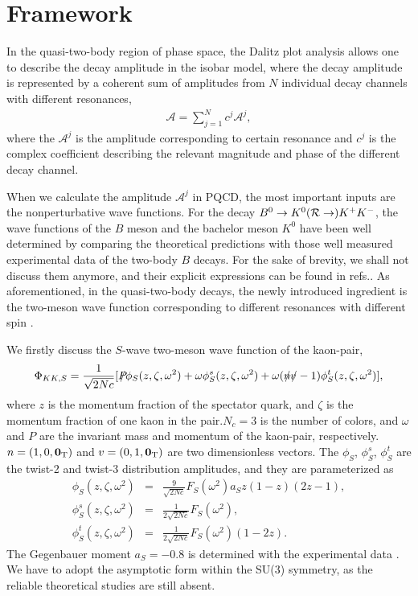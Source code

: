 \documentclass[11pt]{article}
\begin{document}
\section{Framework} \label{frame}
In the quasi-two-body region of phase space, the Dalitz plot analysis allows one to describe the decay amplitude in the isobar model, where the decay amplitude is represented by a coherent sum of amplitudes from  $N$ individual decay channels with different resonances,
\begin{eqnarray} \label{isobar}
\mathcal{A}=\sum_{j=1}^{N} c^j \mathcal{A}^j,
\end{eqnarray}
where the $\mathcal{A}^j$ is the amplitude corresponding to certain resonance and $c^j$ is the complex coefficient describing the relevant magnitude and phase of the different decay channel.

When we calculate the amplitude $\mathcal{A}^j$ in PQCD, the most important inputs are the nonperturbative wave functions. For the decay $B^0\to K^0({\cal R}\to ) K^+K^-$, the wave functions of the $B$ meson and the bachelor meson $K^0$ have been well determined by comparing the theoretical predictions with those well measured experimental data of the two-body $B$ decays. For the sake of brevity, we shall not discuss them anymore, and their explicit expressions can be found in refs.\cite{Keum:2000ph, Lu:2000em, Ali:2007ff}. As aforementioned, in the quasi-two-body decays, the newly introduced ingredient is the two-meson wave function corresponding to different resonances with different spin \cite{Wang:2014ira}.

We firstly discuss the $S$-wave two-meson wave function of the kaon-pair,
\begin{eqnarray}
\Phi_{KK,S}=\frac{1}{\sqrt{2Nc}}[P\mkern-11.5mu/\phi_S(z,\zeta,\omega^2)+\omega\phi_S^s(z,\zeta,\omega^2)
+\omega(n\mkern-9.5mu/ v\mkern-7.5mu/-1)\phi_S^t(z,\zeta,\omega^2)],
\end{eqnarray}
where $z$ is the momentum fraction of the spectator quark, and $\zeta$ is the momentum fraction of one kaon in the pair.$N_c=3$ is the number of colors, and $\omega$ and $P$ are the invariant mass and momentum of the kaon-pair, respectively. $n=(1, 0, {\bf 0_{\rm T}} )$ and $v=(0, 1, {\bf 0_{\rm T}} )$ are two dimensionless vectors. The $\phi_S$, $\phi_S^s$, $\phi_S^t$ are the twist-2 and twist-3 distribution amplitudes, and they are parameterized as \cite{Diehl:1998dk}
\begin{eqnarray}
\phi_S(z,\zeta,\omega^2)&=&\frac{9}{\sqrt{2Nc}}F_S(\omega^2)a_Sz(1-z)(2z-1),\\
\phi_S^s(z,\zeta,\omega^2)&=&\frac{1}{2\sqrt{2Nc}}F_S(\omega^2),\\
\phi_S^t(z,\zeta,\omega^2)&=&\frac{1}{2\sqrt{2Nc}}F_S(\omega^2)(1-2z).
\end{eqnarray}
The Gegenbauer moment $a_S=-0.8$ is determined with the experimental data \cite{Lees:2011nf}. We have to adopt the asymptotic form within the SU(3) symmetry, as the reliable theoretical studies are still absent.
\end{document}

